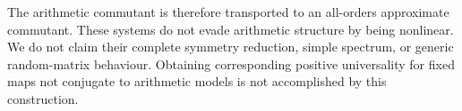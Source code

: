 \] The arithmetic commutant is therefore transported to an all-orders approximate commutant. These systems do not evade arithmetic structure by being nonlinear. We do not claim their complete symmetry reduction, simple spectrum, or generic random-matrix behaviour. Obtaining corresponding positive universality for fixed maps not conjugate to arithmetic models is not accomplished by this construction.
